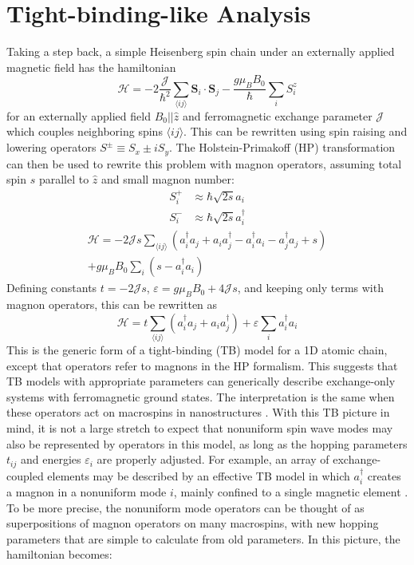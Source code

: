 \documentclass[aps,prx,twocolumn,superscriptaddress,floatfix]{revtex4-2}
\begin{document}
\section{Tight-binding-like Analysis}\label{sec:TB_Analysis}
Taking a step back, a simple Heisenberg spin chain under an externally applied magnetic field has the hamiltonian \cite{stancil_quantum_2009}
\begin{equation}
    \mathcal{H}=-2\dfrac{\mathcal{J}}{\hbar^2}\sum_{\langle ij\rangle}{\mathbf{S}_i \cdot \mathbf{S}_{j}}-\dfrac{g\mu_BB_0}{\hbar}\sum_i{S_{i}^z}
\end{equation}
for an externally applied field $B_0||\hat{z}$ and ferromagnetic exchange parameter $\mathcal{J}$ which couples neighboring spins $\langle ij\rangle$.
    This can be rewritten using spin raising and lowering operators $S^{\pm}\equiv S_x\pm iS_y$. The Holstein-Primakoff (HP) transformation \cite{holstein_field_1940} can then be used to rewrite this problem with magnon operators, assuming total spin $s$ parallel to $\hat{z}$ and small magnon number:
\begin{equation}
\begin{split}
    S^+_i&\approx\hbar\sqrt{2s}a_i \\
    S^-_i&\approx\hbar\sqrt{2s}a_i^\dagger
\end{split}
\end{equation}
\begin{equation}
\begin{split}
    \mathcal{H}=-2\mathcal{J}s\sum_{\langle ij\rangle}{\left( a_i^\dagger a_{j}+a_i a_{j}^\dagger-a_i^\dagger a_i-a_{j}^\dagger a_{j}+s \right)} \\
    +g\mu_BB_0\sum_i{\left(s-a_i^\dagger a_i\right)}
\end{split}
\end{equation}
Defining constants $t=-2\mathcal{J}s$, $\varepsilon=g\mu_BB_0+4\mathcal{J}s$, and keeping only terms with magnon operators, this can be rewritten as
\begin{equation}
    \mathcal{H}=t\sum_{\langle ij\rangle}{\left(a_i^\dagger a_j +a_i a_j^\dagger\right) }+\varepsilon \sum_i{a_i^\dagger a_i}
\end{equation}
This is the generic form of a tight-binding (TB) model for a 1D atomic chain, except that operators refer to magnons in the HP formalism. This suggests that TB models with appropriate parameters can generically describe exchange-only systems with ferromagnetic ground states. The interpretation is the same when these operators act on macrospins in nanostructures \cite{iacocca_reconfigurable_2016}. With this TB picture in mind, it is not a large stretch to expect that nonuniform spin wave modes may also be represented by operators in this model, as long as the hopping parameters $t_{ij}$ and energies $\varepsilon_i$ are properly adjusted. For example, an array of exchange-coupled elements may be described by an effective TB model in which $a_i^\dagger$ creates a magnon in a nonuniform mode $i$, mainly confined to a single magnetic element \cite{shindou_chiral_2013}. To be more precise, the nonuniform mode operators can be thought of as superpositions of magnon operators on many macrospins, with new hopping parameters that are simple to calculate from old parameters. In this picture, the hamiltonian becomes:
\end{document}
